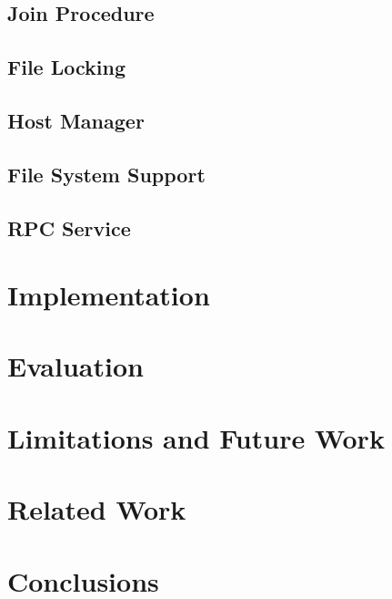 \documentclass[letterpaper,twocolumn,10pt]{article}
\begin{document}
\subsection{Join Procedure}
\label{sec:joinProcedure}


\subsection{File Locking}
\label{sec:fileLocking}


\subsection{Host Manager}
\label{sec:hostManager}


\subsection{File System Support}
\label{sec:fsSupport}


\subsection{RPC Service}
\label{sec:rpcService}


\section{Implementation}
\label{sec:implementation}


\section{Evaluation}
\label{sec:evaluation}


\section{Limitations and Future Work}
\label{sec:limitations}


\section{Related Work}
\label{sec:relatedWork}


\section{Conclusions}


{\footnotesize 
}


\theendnotes
\end{document}
